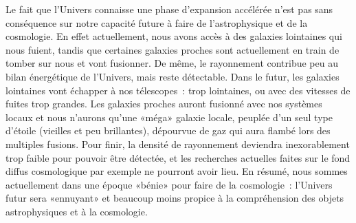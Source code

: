 Le fait que l'Univers connaisse une phase d'expansion accélérée n'est pas sans conséquence sur notre capacité future à faire de l'astrophysique et de la cosmologie. En effet actuellement, nous avons accès à des galaxies lointaines qui nous fuient, tandis que certaines galaxies proches sont actuellement en train de tomber sur nous et vont fusionner. De même, le rayonnement contribue peu au bilan énergétique de l'Univers, mais reste détectable. Dans le futur, les galaxies lointaines vont échapper à nos télescopes~: trop lointaines, ou avec des vitesses de fuites trop grandes. Les galaxies proches auront fusionné avec nos systèmes locaux et nous n'aurons qu'une «méga» galaxie locale, peuplée d'un seul type d'étoile (vieilles et peu brillantes), dépourvue de gaz qui aura flambé lors des multiples fusions. Pour finir, la densité de rayonnement deviendra inexorablement trop faible pour pouvoir être détectée, et les recherches actuelles faites sur le fond diffus cosmologique par exemple ne pourront avoir lieu. En résumé, nous sommes actuellement dans une époque «bénie» pour faire de la cosmologie~: l'Univers futur sera «ennuyant» et beaucoup moins propice à la compréhension des objets astrophysiques et à la cosmologie.
